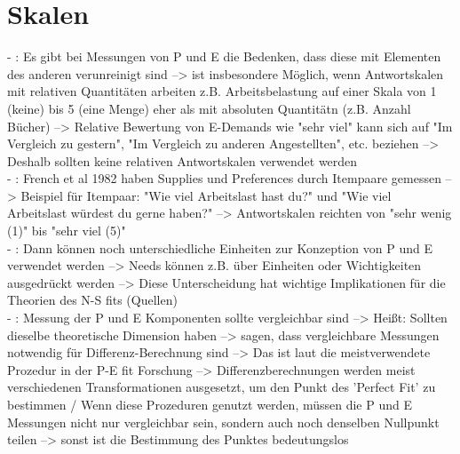 \section{Skalen}
\label{ch:personEnvironmentFit:skalen}
- \cite[S. 14]{caplan:1987}: Es gibt bei Messungen von P und E die Bedenken, dass diese mit Elementen des anderen verunreinigt sind --> ist insbesondere Möglich, wenn Antwortskalen mit relativen Quantitäten arbeiten z.B. Arbeitsbelastung auf einer Skala von 1 (keine) bis 5 (eine Menge) eher als mit absoluten Quantitätn (z.B.  Anzahl Bücher) --> Relative Bewertung von E-Demands wie "sehr viel" kann sich auf "Im Vergleich zu gestern", "Im Vergleich zu anderen Angestellten", etc. beziehen --> Deshalb sollten keine relativen Antwortskalen verwendet werden  \\
- \cite[S. 5]{edwards:1993}: French et al 1982 haben Supplies und Preferences durch Itempaare gemessen --> Beispiel für Itempaar: "Wie viel Arbeitslast hast du?" und "Wie viel Arbeitslast würdest du gerne haben?" --> Antwortskalen reichten von "sehr wenig (1)" bis "sehr viel (5)" \\
- \cite[S. 5]{edwards:2008}: Dann können noch unterschiedliche Einheiten zur Konzeption von P und E verwendet werden --> Needs können z.B. über Einheiten oder Wichtigkeiten ausgedrückt werden --> Diese Unterscheidung hat wichtige Implikationen für die Theorien des N-S fits (Quellen) \\
- \cite[S. 8]{edwards:1990}: Messung der P und E Komponenten sollte vergleichbar sind --> Heißt: Sollten dieselbe theoretische Dimension haben --> \textcite{copingAndAdaption:1974} sagen, dass vergleichbare Messungen notwendig für Differenz-Berechnung sind --> Das ist laut \textcite{jobDemandsAndWorkerHealth:1975} die meistverwendete Prozedur in der P-E fit Forschung --> Differenzberechnungen werden meist verschiedenen Transformationen ausgesetzt, um den Punkt des 'Perfect Fit' zu bestimmen \textcite{jobDemandsAndWorkerHealth:1975} / Wenn diese Prozeduren genutzt werden, müssen die P und E Messungen nicht nur vergleichbar sein, sondern auch noch denselben Nullpunkt teilen --> sonst ist die Bestimmung des Punktes bedeutungslos \\
